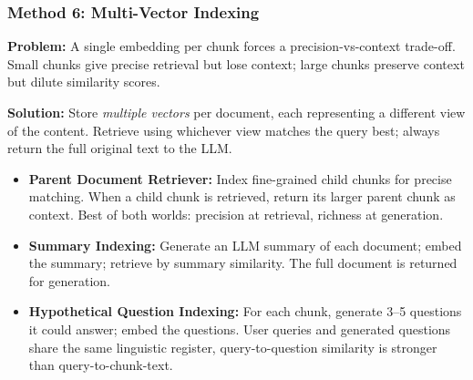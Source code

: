 \begin{frame}[fragile]\frametitle{Method 6: Multi-Vector Indexing}

\textbf{Problem:} A single embedding per chunk forces a precision-vs-context trade-off. Small chunks give precise retrieval but lose context; large chunks preserve context but dilute similarity scores.

\textbf{Solution:} Store \textit{multiple vectors} per document, each representing a different view of the content. Retrieve using whichever view matches the query best; always return the full original text to the LLM.

\begin{itemize}
  \item \textbf{Parent Document Retriever:}
    Index fine-grained child chunks for precise matching. When a child chunk is retrieved, return its larger parent chunk as context. Best of both worlds: precision at retrieval, richness at generation.

  \item \textbf{Summary Indexing:}
    Generate an LLM summary of each document; embed the summary; retrieve by summary similarity. The full document is returned for generation.

  \item \textbf{Hypothetical Question Indexing:}
    For each chunk, generate 3--5 questions it could answer; embed the questions. User queries and generated questions share the same linguistic register, query-to-question similarity is stronger than query-to-chunk-text.
\end{itemize}

\end{frame}


